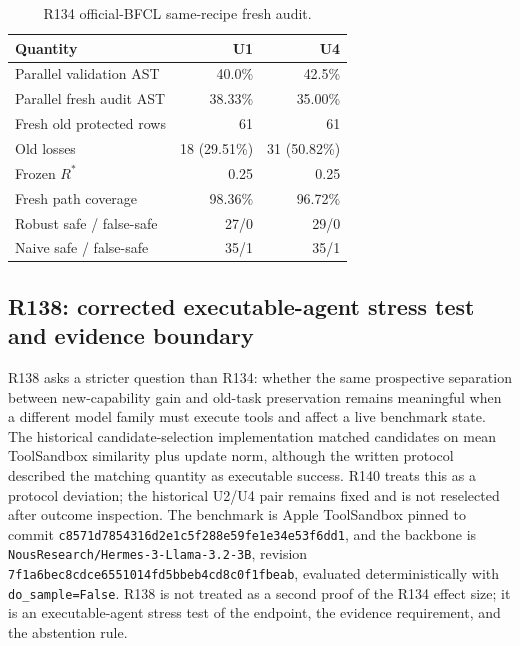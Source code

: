 \documentclass[11pt,letterpaper]{article}
\theoremstyle{plain}
\newcommand{\1}{\mathbf 1}
\begin{document}
\begin{table}[H]
\centering
\caption{R134 official-BFCL same-recipe fresh audit.}
\label{tab:r137_r134}
\small
\begin{tabular}{lrr}
\toprule
Quantity & U1 & U4\\
\midrule
Parallel validation AST & 40.0\% & 42.5\%\\
Parallel fresh audit AST & 38.33\% & 35.00\%\\
Fresh old protected rows & 61 & 61\\
Old losses & 18 (29.51\%) & 31 (50.82\%)\\
Frozen $R^*$ & 0.25 & 0.25\\
Fresh path coverage & 98.36\% & 96.72\%\\
Robust safe / false-safe & 27/0 & 29/0\\
Naive safe / false-safe & 35/1 & 35/1\\
\bottomrule
\end{tabular}
\end{table}

\subsection{R138: corrected executable-agent stress test and evidence boundary}
R138 asks a stricter question than R134: whether the same prospective separation between new-capability gain and old-task preservation remains meaningful when a different model family must execute tools and affect a live benchmark state. The historical candidate-selection implementation matched candidates on mean ToolSandbox similarity plus update norm, although the written protocol described the matching quantity as executable success. R140 treats this as a protocol deviation; the historical U2/U4 pair remains fixed and is not reselected after outcome inspection. The benchmark is Apple ToolSandbox pinned to commit \texttt{c8571d7854316d2e1c5f288e59fe1e34e53f6dd1}, and the backbone is \texttt{NousResearch/Hermes-3-Llama-3.2-3B}, revision \texttt{7f1a6bec8cdce6551014fd5bbeb4cd8c0f1fbeab}, evaluated deterministically with \texttt{do\_sample=False}. R138 is not treated as a second proof of the R134 effect size; it is an executable-agent stress test of the endpoint, the evidence requirement, and the abstention rule.
\end{document}
